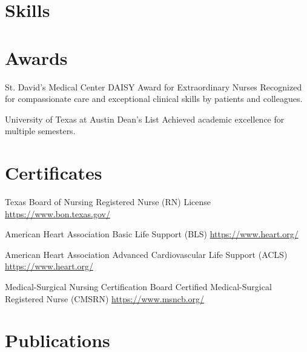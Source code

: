 \documentclass[a4paper, serif, 10pt]{moderncv}
\begin{document}
\section{Skills}

\section{Awards}

        {St. David's Medical Center}
        {DAISY Award for Extraordinary Nurses}
        {}
        {}
        {Recognized for compassionate care and exceptional clinical skills by patients and colleagues.}

        {University of Texas at Austin}
        {Dean's List}
        {}
        {}
        {Achieved academic excellence for multiple semesters.}
\section{Certificates}

        {Texas Board of Nursing}
        {Registered Nurse (RN) License}
        {\url{https://www.bon.texas.gov/}}
        {}
        {}

        {American Heart Association}
        {Basic Life Support (BLS)}
        {\url{https://www.heart.org/}}
        {}
        {}

        {American Heart Association}
        {Advanced Cardiovascular Life Support (ACLS)}
        {\url{https://www.heart.org/}}
        {}
        {}

        {Medical-Surgical Nursing Certification Board}
        {Certified Medical-Surgical Registered Nurse (CMSRN)}
        {\url{https://www.msncb.org/}}
        {}
        {}
\section{Publications}
\end{document}
